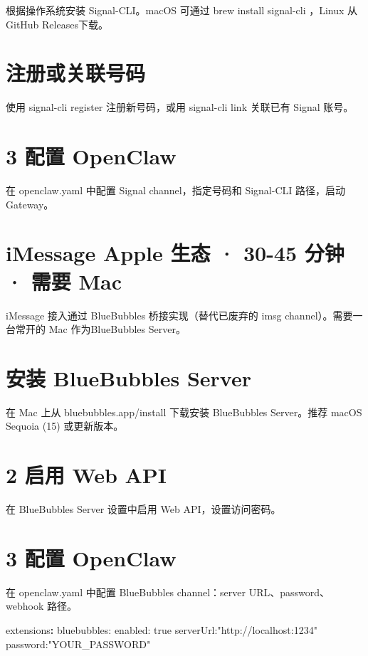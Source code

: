 \documentclass[
  10
]{article}
\newenvironment{Shaded}{}{}
\newcommand{\AttributeTok}[1]{\textcolor[rgb]{0.49,0.56,0.16}{#1}}
\newcommand{\FunctionTok}[1]{\textcolor[rgb]{0.02,0.16,0.49}{#1}}
\newcommand{\KeywordTok}[1]{\textcolor[rgb]{0.00,0.44,0.13}{\textbf{#1}}}
\begin{document}
根据操作系统安装 Signal-CLI。macOS 可通过 brew install signal-cli
，Linux 从 GitHub Releases下载。

\section{注册或关联号码}\label{ux6ce8ux518cux6216ux5173ux8054ux53f7ux7801}

使用 signal-cli register 注册新号码，或用 signal-cli link 关联已有
Signal 账号。

\section{3 配置 OpenClaw}\label{ux914dux7f6e-openclaw}

在 openclaw.yaml 中配置 Signal channel，指定号码和 Signal-CLI 路径，启动
Gateway。

\section{iMessage Apple ⽣态 · 30-45 分钟 · 需要
Mac}\label{imessage-apple-ux6001-30-45-ux5206ux949f-ux9700ux8981-mac}

iMessage 接入通过 BlueBubbles 桥接实现（替代已废弃的 imsg
channel）。需要一台常开的 Mac 作为BlueBubbles Server。

\section{安装 BlueBubbles Server}\label{ux5b89ux88c5-bluebubbles-server}

在 Mac 上从 bluebubbles.app/install 下载安装 BlueBubbles Server。推荐
macOS Sequoia (15) 或更新版本。

\section{2 启用 Web API}\label{ux542fux7528-web-api}

在 BlueBubbles Server 设置中启用 Web API，设置访问密码。

\section{3 配置 OpenClaw}\label{ux914dux7f6e-openclaw-1}

在 openclaw.yaml 中配置 BlueBubbles channel：server
URL、password、webhook 路径。

\begin{Shaded}
\begin{Highlighting}[]
\FunctionTok{extensions}\KeywordTok{:}\AttributeTok{ bluebubbles: enabled: true serverUrl:"http://localhost:1234" password:"YOUR\_PASSWORD"}
\end{Highlighting}
\end{Shaded}
\end{document}

